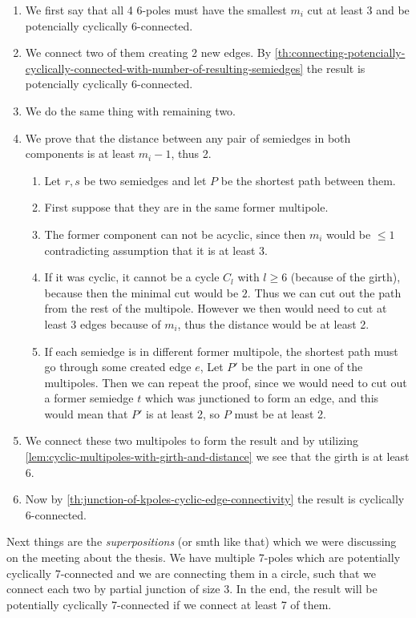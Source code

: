 \documentclass[12pt, twoside]{book}
\begin{document}
\begin{enumerate}
	\item We first say that all 4 6-poles must have the smallest $m_i$ cut at least 3 and be potencially cyclically $6$-connected.
	\item We connect two of them creating 2 new edges. By \cref{th:connecting-potencially-cyclically-connected-with-number-of-resulting-semiedges} the result is potencially cyclically $6$-connected.
	\item We do the same thing with remaining two.
	\item We prove that the distance between any pair of semiedges in both components is at least $m_i-1$, thus 2.
	\begin{enumerate}
		\item Let $r,s$ be two semiedges and let $P$ be the shortest path between them.
		\item First suppose that they are in the same former multipole.
		\item The former component can not be acyclic, since then $m_i$ would be $\leq 1$ contradicting assumption that it is at least 3.
		\item If it was cyclic, it cannot be a cycle $C_l$ with $l\geq 6$ (because of the girth), because then the minimal cut would be $2$. Thus we can cut out the path from the rest of the multipole. However we then would need to cut at least $3$ edges because of $m_i$, thus the distance would be at least 2.
		\item If each semiedge is in different former multipole, the shortest path must go through some created edge $e$, Let $P'$ be the part in one of the multipoles. Then we can repeat the proof, since we would need to cut out a former semiedge $t$ which was junctioned to form an edge, and this would mean that $P'$ is at least 2, so $P$ must be at least 2.
	\end{enumerate}
	\item We connect these two multipoles to form the result and by utilizing \cref{lem:cyclic-multipoles-with-girth-and-distance} we see that the girth is at least $6$.
	\item Now by \cref{th:junction-of-kpoles-cyclic-edge-connectivity} the result is cyclically 6-connected.
\end{enumerate}


Next things are the \textit{superpositions} (or smth like that) which we were discussing on the meeting about the thesis. We have multiple 7-poles which are potentially cyclically 7-connected and we are connecting them in a circle, such that we connect each two by partial junction of size 3. In the end, the result will be potentially cyclically 7-connected if we connect at least 7 of them.
\end{document}

